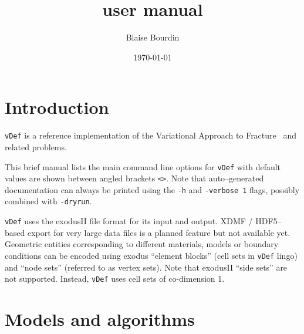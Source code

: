 \documentclass[10pt,oneside]{memoir}
\title{\vDef user manual}
\author{Blaise Bourdin}
\date{\today}
\def\vDef{{\texttt{vDef}} }
\begin{document}

\maketitle

\tableofcontents
\chapter*{Introduction}
\vDef is a reference implementation of the Variational Approach to Fracture~\cite{Francfort-Marigo-1998,Bourdin-Francfort-EtAl-2008b} and related problems. 
 
 

This brief manual lists the main command line options for \vDef with default values are shown between angled brackets \verb+<>+. Note that auto--generated documentation can always be printed using the \texttt{-h} and  \texttt{-verbose 1} flags, possibly combined with \texttt{-dryrun}.


\vDef uses the exodusII file format for its input and output. XDMF / HDF5--based export for very large data files is a planned feature but not available yet. Geometric entities corresponding to different materials, models or boundary conditions can be encoded using exodus ``element blocks'' (cell sets in \vDef lingo) and ``node sets'' (referred to as vertex sets). Note that exodusII ``side sets'' are not supported. Instead, \vDef uses cell sets of co-dimension 1.


\newpage
\chapter{Models and algorithms}
\end{document}

